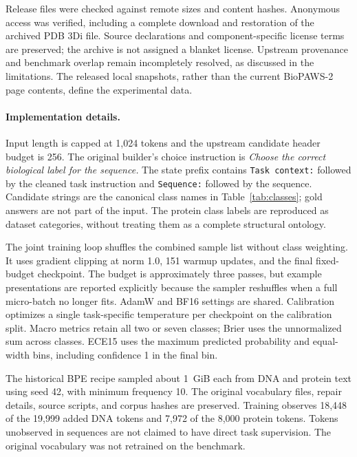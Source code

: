 Release files were checked against remote sizes and content hashes. Anonymous access was verified, including a complete download and restoration of the archived PDB 3Di file. Source declarations and component-specific license terms are preserved; the archive is not assigned a blanket license. Upstream provenance and benchmark overlap remain incompletely resolved, as discussed in the limitations. The released local snapshots, rather than the current BioPAWS-2 page contents, define the experimental data.

\paragraph{Implementation details.}
Input length is capped at 1,024 tokens and the upstream candidate header budget is 256. The original builder's choice instruction is \emph{Choose the correct biological label for the sequence.} The state prefix contains \texttt{Task context:} followed by the cleaned task instruction and \texttt{Sequence:} followed by the sequence. Candidate strings are the canonical class names in Table~\ref{tab:classes}; gold answers are not part of the input. The protein class labels are reproduced as dataset categories, without treating them as a complete structural ontology.

The joint training loop shuffles the combined sample list without class weighting. It uses gradient clipping at norm 1.0, 151 warmup updates, and the final fixed-budget checkpoint. The budget is approximately three passes, but example presentations are reported explicitly because the sampler reshuffles when a full micro-batch no longer fits. AdamW and BF16 settings are shared. Calibration optimizes a single task-specific temperature per checkpoint on the calibration split. Macro metrics retain all two or seven classes; Brier uses the unnormalized sum across classes. ECE15 uses the maximum predicted probability and equal-width bins, including confidence 1 in the final bin.

The historical BPE recipe sampled about 1~GiB each from DNA and protein text using seed 42, with minimum frequency 10. The original vocabulary files, repair details, source scripts, and corpus hashes are preserved. Training observes 18,448 of the 19,999 added DNA tokens and 7,972 of the 8,000 protein tokens. Tokens unobserved in sequences are not claimed to have direct task supervision. The original vocabulary was not retrained on the benchmark.

\begin{table}[ht]
\centering\small

\caption{All test seeds; no best-seed selection. Classification metrics are percentages.}
\label{tab:seeds}
\end{table}

